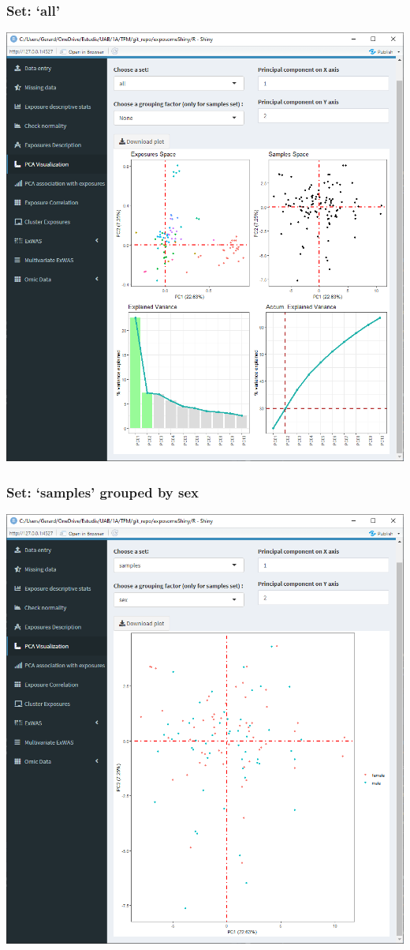 \documentclass[
]{book}
\begin{document}
\hypertarget{set-all}{%
\subsubsection{Set: `all'}\label{set-all}}

\includegraphics{images/analysis5_2.png}

\hypertarget{set-samples-grouped-by-sex}{%
\subsubsection{Set: `samples' grouped by sex}\label{set-samples-grouped-by-sex}}

\includegraphics{images/analysis5_2_1.png}
\end{document}
